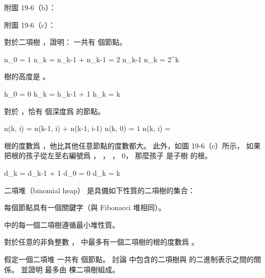 \midaligned{\externalfigure[output/p19_2-1][scale=600]}

附圖 19-6（b）：

\midaligned{\externalfigure[output/p19_2-2][scale=600]}

附圖 19-6（c）：

\midaligned{\externalfigure[output/p19_2-3][scale=600]}

\startigBase[a]\startitem
對於二項樹 ，證明：
\stopitem
  \startigBase[n]
  \startitem
  一共有  個節點。
  \stopitem

\startANSWER
\startformula\startmathalignment
\NC n_0 \NC = 1 \NR
\NC n_k \NC = n_{k-1} + n_{k-1} = 2 n_{k-1} \NR
\NC n_k \NC = 2^k \NR
\stopmathalignment\stopformula
\stopANSWER

  \startitem
  樹的高度是 。
  \stopitem

\startANSWER
\startformula\startmathalignment
\NC h_0 \NC = 0 \NR
\NC h_k \NC = h_{k-1} + 1 \NR
\NC h_k \NC = k \NR
\stopmathalignment\stopformula
\stopANSWER

  \startitem
  對於 ，恰有  個深度爲  的節點。
  \stopitem

\startANSWER
\startformula\startmathalignment
\NC n(k, i) \NC = n(k-1, i) + n(k-1, i-1) \NR
\NC n(k, 0) \NC = 1 \NR
\NC n(k, i) \NC =  \NR
\stopmathalignment\stopformula
\stopANSWER

  \startitem
  根的度數爲 ，他比其他任意節點的度數都大。
  此外，如圖 19-6（c）所示，
  如果把根的孩子從左至右編號爲 ， ， \m{\ldots}， 0，
  那麼孩子  是子樹  的根。
  \stopitem

\startANSWER
\startformula\startmathalignment
\NC d_k \NC = d_{k-1} + 1 \NR
\NC d_0 \NC = 0 \NR
\NC d_k \NC = k \NR
\stopmathalignment\stopformula
\stopANSWER
  \stopigBase
\stopigBase

{\EMP 二項堆}（binomial heap）  是具備如下性質的二項樹的集合：
\startigNum[n]
\item 每個節點具有一個關鍵字（與 Fibonacci 堆相同）。
\item  {} 中的每一個二項樹遵循最小堆性質。
\item 對於任意的非負整數 ，  中最多有一個二項樹的根的度數爲 。
\stopigNum

\startigBase[continue]\startitem
假定一個二項堆  一共有  個節點。
討論  中包含的二項樹與  的二進制表示之間的關係。
並證明  最多由  棵二項樹組成。
\stopitem\stopigBase

